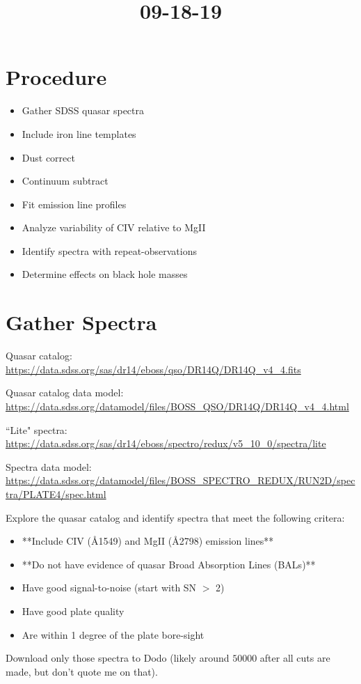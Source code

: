 \documentclass[12pt]{article}
\begin{document}
\title{09-18-19}
\author{}
\maketitle
    \section{Procedure}
        \begin{itemize}
            \item Gather SDSS quasar spectra
            \item Include iron line templates
            \item Dust correct
            \item Continuum subtract
            \item Fit emission line profiles
            \item Analyze variability of CIV relative to MgII
            \item Identify spectra with repeat-observations
            \item Determine effects on black hole masses
        \end{itemize}

    \section{Gather Spectra}
        Quasar catalog: \url{https://data.sdss.org/sas/dr14/eboss/qso/DR14Q/DR14Q_v4_4.fits}

        Quasar catalog data model: \url{https://data.sdss.org/datamodel/files/BOSS_QSO/DR14Q/DR14Q_v4_4.html}

        ``Lite" spectra: \url{https://data.sdss.org/sas/dr14/eboss/spectro/redux/v5_10_0/spectra/lite}

        Spectra data model: \url{https://data.sdss.org/datamodel/files/BOSS_SPECTRO_REDUX/RUN2D/spectra/PLATE4/spec.html}

        Explore the quasar catalog and identify spectra that meet the following critera:
        \begin{itemize}
            \item **Include CIV (\AA 1549) and MgII (\AA 2798) emission lines**
            \item **Do not have evidence of quasar Broad Absorption Lines (BALs)**
            \item Have good signal-to-noise (start with SN $>$ 2)
            \item Have good plate quality
            \item Are within 1 degree of the plate bore-sight
        \end{itemize}

        Download only those spectra to Dodo (likely around $50000$ after all cuts are made, but don't quote me on that).
\end{document}

